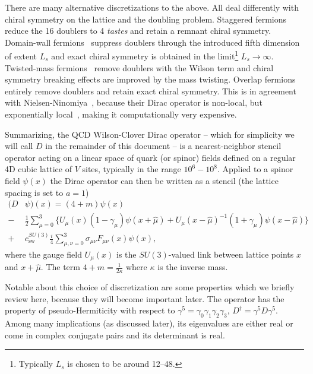 There are many alternative discretizations to the above.
All deal differently with chiral symmetry on the lattice and the doubling problem.
Staggered fermions~\cite{PhysRevD.11.395} reduce the \num{16} doublers to \num{4} \emph{tastes} and retain a remnant  chiral symmetry.
Domain-wall fermions~\cite{Kaplan:1992bt,Shamir:1993zy} suppress doublers through the introduced fifth dimension of extent $L_s$ and exact chiral symmetry is obtained in the limit\footnote{Typically $L_s$ is chosen to be around \numrange{12}{48}.} $L_s \to \infty$.
Twisted-mass fermions~\cite{Frezzotti:2000nk} remove doublers with the Wilson term and chiral symmetry breaking effects are improved by the mass twisting.
Overlap fermions~\cite{Neuberger:1997fp,Neuberger:1998wv} entirely remove doublers and retain exact chiral symmetry.
This is in agreement with Nielsen-Ninomiya~\cite{Nielsen:1980rz,Nielsen:1981xu}, because their Dirac operator is non-local, but exponentially local~\cite{Hernandez:1998et,Boyle:2016imm}, making it computationally very expensive.

Summarizing, the QCD Wilson-Clover Dirac operator -- which for simplicity we will call $D$ in the remainder of this document -- is a nearest-neighbor stencil operator acting on a linear space of quark (or spinor) fields defined on a regular 4D cubic lattice of $V$ sites, typically in the range $10^6-10^8$.
Applied to a spinor field $\psi(x)$ the Dirac operator can then be written as a stencil (the lattice spacing is set to $a = 1$)
\begin{equation}
\begin{aligned} \label{eq:Dw}
(D &\psi)(x) = (4 + m) \psi(x) \\
-&\frac{1}{2} \sum_{\mu=0}^3 \Big\{
  U_{\mu}(x) (1-\gamma_{\mu}) \psi(x + \hat{\mu})
+ U_{\mu}(x-\hat{\mu})^{-1} (1+\gamma_{\mu}) \psi(x-\hat{\mu})
\Big\} \\
+&c_\mathrm{sw}^{SU(3)} \frac{i}{4} \sum_{\mu,\nu=0}^3 \sigma_{\mu \nu} F_{\mu \nu}(x) \psi(x),
\end{aligned}
\end{equation}
where the gauge field $U_{\mu}(x)$ is the $SU(3)$-valued link between lattice points $x$ and $x + \hat{\mu}$.
The term $4+m = \frac{1}{2 \kappa}$ where $\kappa$ is the inverse mass.

Notable about this choice of discretization are some properties which we briefly review here, because they will become important later.
The operator has the property of pseudo-Hermiticity with respect to $\gamma^5 = \gamma_0 \gamma_1 \gamma_2 \gamma_3$, $D^{\dagger} = \gamma^{5} D \gamma^{5}$.
Among many implications (as discussed later), its eigenvalues are either real or come in complex conjugate pairs and its determinant is real.

